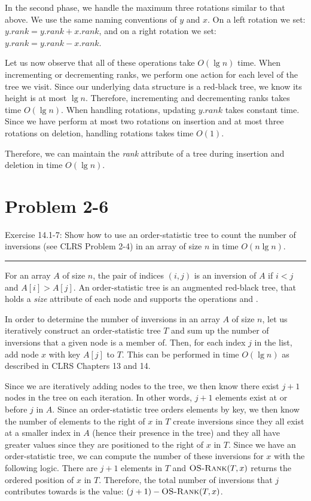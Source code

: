 \documentclass[11pt]{article}
\def\separateline{\medskip\hrule\medskip}
\begin{document}
In the second phase, we handle the maximum three rotations similar to that above. We use the same naming conventions of $y$ and $x$. On a left rotation we set: $y.rank = y.rank + x.rank$, and on a right rotation we set: $y.rank = y.rank - x.rank$.

Let us now observe that all of these operations take $O(\lg{n})$ time. When incrementing or decrementing ranks, we perform one action for each level of the tree we visit. Since our underlying data structure is a red-black tree, we know its height is at most $\lg{n}$. Therefore, incrementing and decrementing ranks takes time $O(\lg{n})$. When handling rotations, updating $y.rank$ takes constant time. Since we have perform at most two rotations on insertion and at most three rotations on deletion, handling rotations takes time $O(1)$.

Therefore, we can maintain the \textit{rank} attribute of a tree during insertion and deletion in time $O(\lg{n})$.

\newpage

\section{Problem 2-6}
Exercise 14.1-7: Show how to use an order-statistic tree to count the number of inversions (see CLRS Problem 2-4) in an array of size $n$ in time $O(n\lg{n})$.
\separateline

For an array $A$ of size $n$, the pair of indices $(i,j)$ is an inversion of $A$ if $i < j$ and $A[i] > A[j]$. An order-statistic tree is an augmented red-black tree, that holds a \textit{size} attribute of each node and supports the operations  and .

In order to determine the number of inversions in an array $A$ of size $n$, let us iteratively construct an order-statistic tree $T$ and sum up the number of inversions that a given node is a member of. Then, for each index $j$ in the list, add node $x$ with key $A[j]$ to $T$. This can be performed in time $O(\lg{n})$ as described in CLRS Chapters 13 and 14.

Since we are iteratively adding nodes to the tree, we then know there exist $j + 1$ nodes in the tree on each iteration. In other words, $j + 1$ elements exist at or before $j$ in $A$. Since an order-statistic tree orders elements by key, we then know the number of elements to the right of $x$ in $T$ create inversions since they all exist at a smaller index in $A$ (hence their presence in the tree) and they all have greater values since they are positioned to the right of $x$ in $T$. Since we have an order-statistic tree, we can compute the number of these inversions for $x$ with the following logic. There are $j + 1$ elements in $T$ and $\textnormal{\scshape OS-Rank}(T,x)$ returns the ordered position of $x$ in $T$. Therefore, the total number of inversions that $j$ contributes towards is the value: $(j+1) - \textnormal{\scshape OS-Rank}(T,x)$.
\end{document}

